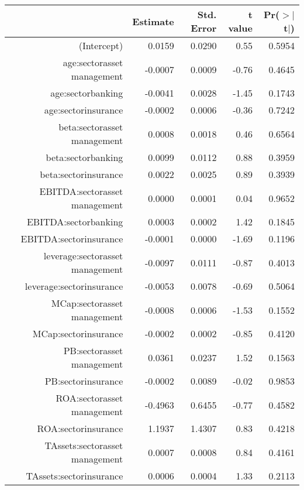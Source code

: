 \begin{table}[ht]
\centering
\begin{tabular}{rrrrr}
  \hline
 & Estimate & Std. Error & t value & Pr($>$$|$t$|$) \\ 
  \hline
(Intercept) & 0.0159 & 0.0290 & 0.55 & 0.5954 \\ 
  age:sectorasset management & -0.0007 & 0.0009 & -0.76 & 0.4645 \\ 
  age:sectorbanking & -0.0041 & 0.0028 & -1.45 & 0.1743 \\ 
  age:sectorinsurance & -0.0002 & 0.0006 & -0.36 & 0.7242 \\ 
  beta:sectorasset management & 0.0008 & 0.0018 & 0.46 & 0.6564 \\ 
  beta:sectorbanking & 0.0099 & 0.0112 & 0.88 & 0.3959 \\ 
  beta:sectorinsurance & 0.0022 & 0.0025 & 0.89 & 0.3939 \\ 
  EBITDA:sectorasset management & 0.0000 & 0.0001 & 0.04 & 0.9652 \\ 
  EBITDA:sectorbanking & 0.0003 & 0.0002 & 1.42 & 0.1845 \\ 
  EBITDA:sectorinsurance & -0.0001 & 0.0000 & -1.69 & 0.1196 \\ 
  leverage:sectorasset management & -0.0097 & 0.0111 & -0.87 & 0.4013 \\ 
  leverage:sectorinsurance & -0.0053 & 0.0078 & -0.69 & 0.5064 \\ 
  MCap:sectorasset management & -0.0008 & 0.0006 & -1.53 & 0.1552 \\ 
  MCap:sectorinsurance & -0.0002 & 0.0002 & -0.85 & 0.4120 \\ 
  PB:sectorasset management & 0.0361 & 0.0237 & 1.52 & 0.1563 \\ 
  PB:sectorinsurance & -0.0002 & 0.0089 & -0.02 & 0.9853 \\ 
  ROA:sectorasset management & -0.4963 & 0.6455 & -0.77 & 0.4582 \\ 
  ROA:sectorinsurance & 1.1937 & 1.4307 & 0.83 & 0.4218 \\ 
  TAssets:sectorasset management & 0.0007 & 0.0008 & 0.84 & 0.4161 \\ 
  TAssets:sectorinsurance & 0.0006 & 0.0004 & 1.33 & 0.2113 \\ 
   \hline
\end{tabular}
\end{table}
